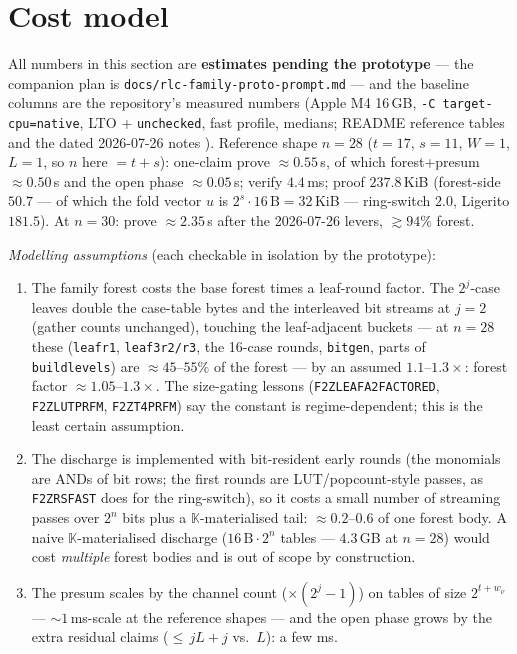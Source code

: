 \documentclass[11pt]{article}
\newcommand{\K}{\mathbb{K}}            %
\DeclareRobustCommand{\code}[1]{{\def\_{\textunderscore\allowbreak}\texttt{#1}}}
\theoremstyle{plain}
\theoremstyle{definition}
\theoremstyle{remark}
\begin{document}
\section{Cost model}\label{sec:cost}

All numbers in this section are \textbf{estimates pending the prototype} ---
the companion plan is \code{docs/rlc-family-proto-prompt.md} --- and the
baseline columns are the
repository's measured numbers (Apple M4 16\,GB, \code{-C target-cpu=native},
LTO + \code{unchecked}, fast profile, medians; README reference tables and
the dated 2026-07-26 notes \cite{F2Zreadme}). Reference shape $n=28$
($t=17$, $s=11$, $W=1$, $L=1$, so $n$ here $=t+s$): one-claim prove
$\approx0.55$\,s, of which forest+presum $\approx0.50$\,s and the open phase
$\approx0.05$\,s; verify $4.4$\,ms; proof $237.8$\,KiB (forest-side
$50.7$ --- of which the fold vector $u$ is $2^{s}\cdot16\,\mathrm B=32$\,KiB
--- ring-switch $2.0$, Ligerito $181.5$). At $n=30$: prove
$\approx2.35$\,s after the 2026-07-26 levers, $\gtrsim 94\%$ forest.

\emph{Modelling assumptions} (each checkable in isolation by the prototype):
\begin{enumerate}[label=\textup{(A\arabic*)},leftmargin=2.4em,itemsep=1pt]
\item The family forest costs the base forest times a leaf-round factor. The
  $2^{j}$-case leaves double the case-table bytes and the interleaved bit
  streams at $j=2$ (gather counts unchanged), touching the leaf-adjacent
  buckets --- at $n=28$ these (\code{leaf\_r1}, \code{leaf3\_r2/r3}, the
  16-case rounds, \code{bitgen}, parts of \code{build\_levels}) are
  ${\approx}45$--$55\%$ of the forest --- by an assumed $1.1$--$1.3\times$:
  forest factor ${\approx}1.05$--$1.3\times$. The size-gating lessons
  (\code{F2Z\_LEAF\_A2\_FACTORED}, \code{F2Z\_LUT\_PRFM},
  \code{F2Z\_T4\_PRFM}) say the constant is regime-dependent; this is the
  least certain assumption.
\item The discharge is implemented with bit-resident early rounds (the
  monomials are ANDs of bit rows; the first rounds are LUT/popcount-style
  passes, as \code{F2Z\_RS\_FAST} does for the ring-switch), so it costs a
  small number of streaming passes over $2^{n}$ bits plus a
  $\K$-materialised tail: ${\approx}0.2$--$0.6$ of one forest body. A naive
  $\K$-materialised discharge ($16\,\mathrm B\cdot2^{n}$ tables ---
  $4.3$\,GB at $n=28$) would cost \emph{multiple} forest bodies and is out
  of scope by construction.
\item The presum scales by the channel count ($\times(2^{j}-1)$) on tables of
  size $2^{t+w_\nu}$ --- ${\sim}1$\,ms-scale at the reference shapes ---
  and the open phase grows by the extra residual claims
  (${\le}\,jL{+}j$ vs.\ $L$): a few ms.
\end{enumerate}
\end{document}

